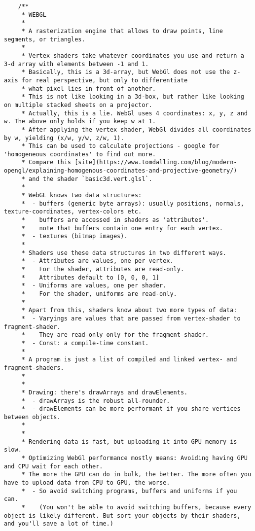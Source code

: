 {\begin{lstlisting}
    /**
     * WEBGL
     *
     * A rasterization engine that allows to draw points, line segments, or triangles.
     *
     * Vertex shaders take whatever coordinates you use and return a 3-d array with elements between -1 and 1.
     * Basically, this is a 3d-array, but WebGl does not use the z-axis for real perspective, but only to differentiate
     * what pixel lies in front of another.
     * This is not like looking in a 3d-box, but rather like looking on multiple stacked sheets on a projector.
     * Actually, this is a lie. WebGl uses 4 coordinates: x, y, z and w. The above only holds if you keep w at 1.
     * After applying the vertex shader, WebGl divides all coordinates by w, yielding (x/w, y/w, z/w, 1).
     * This can be used to calculate projections - google for 'homogeneous coordinates' to find out more.
     * Compare this [site](https://www.tomdalling.com/blog/modern-opengl/explaining-homogenous-coordinates-and-projective-geometry/)
     * and the shader `basic3d.vert.glsl`.
     *
     * WebGL knows two data structures:
     *  - buffers (generic byte arrays): usually positions, normals, texture-coordinates, vertex-colors etc.
     *    buffers are accessed in shaders as 'attributes'.
     *    note that buffers contain one entry for each vertex.
     *  - textures (bitmap images).
     *
     * Shaders use these data structures in two different ways.
     *  - Attributes are values, one per vertex.
     *    For the shader, attributes are read-only.
     *    Attributes default to [0, 0, 0, 1]
     *  - Uniforms are values, one per shader.
     *    For the shader, uniforms are read-only.
     *
     * Apart from this, shaders know about two more types of data:
     *  - Varyings are values that are passed from vertex-shader to fragment-shader.
     *    They are read-only only for the fragment-shader.
     *  - Const: a compile-time constant.
     *
     * A program is just a list of compiled and linked vertex- and fragment-shaders.
     *
     *
     * Drawing: there's drawArrays and drawElements.
     *  - drawArrays is the robust all-rounder.
     *  - drawElements can be more performant if you share vertices between objects.
     *
     *
     * Rendering data is fast, but uploading it into GPU memory is slow.
     * Optimizing WebGl performance mostly means: Avoiding having GPU and CPU wait for each other.
     * The more the GPU can do in bulk, the better. The more often you have to upload data from CPU to GPU, the worse.
     *  - So avoid switching programs, buffers and uniforms if you can.
     *    (You won't be able to avoid switching buffers, because every object is likely different. But sort your objects by their shaders, and you'll save a lot of time.)

\end{lstlisting}}
